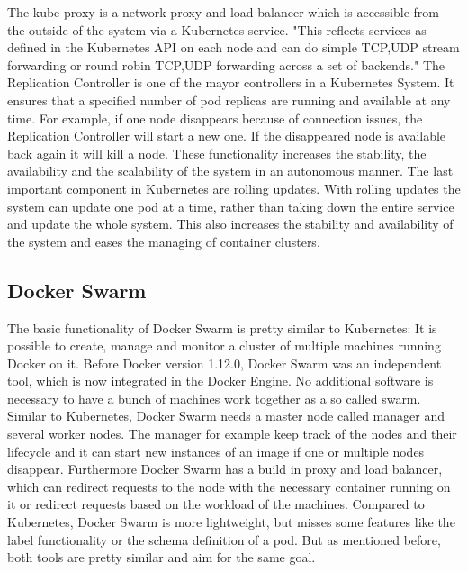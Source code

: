 The kube-proxy is a network proxy and load balancer which is accessible from the outside of the system via a Kubernetes service.\autocite[cf.][p. 7]{Mulyana:2016}
"This reflects services as defined in the Kubernetes API on each node and can do simple TCP,UDP stream forwarding or round robin TCP,UDP forwarding across a set of backends."\autocite{Kubernetes:kube-proxy:2016}
The Replication Controller is one of the mayor controllers in a Kubernetes System.
It ensures that a specified number of pod replicas are running and available at any time.\autocite[cf.]{Kubernetes:replication-controller:2016}
For example, if one node disappears because of connection issues, the Replication Controller will start a new one.
If the disappeared node is available back again it will kill a node.
These functionality increases the stability, the availability and the scalability of the system in an autonomous manner.
The last important component in Kubernetes are rolling updates.
With rolling updates the system can update one pod at a time, rather than taking down the entire service and update the whole system.\autocite[cf.]{Kubernetes:rolling-updates:2016}
This also increases the stability and availability of the system and eases the managing of container clusters.

\subsection{Docker Swarm}
The basic functionality of Docker Swarm is pretty similar to Kubernetes: It is possible to create, manage and monitor a cluster of multiple machines running Docker on it.
Before Docker version 1.12.0, Docker Swarm was an independent tool, which is now integrated in the Docker Engine.\autocite[cf.]{dockerSwarm}
No additional software is necessary to have a bunch of machines work together as a so called swarm.
Similar to Kubernetes, Docker Swarm needs a master node called manager and several worker nodes.
The manager for example keep track of the nodes and their lifecycle and it can start new instances of an image if one or multiple nodes disappear.
Furthermore Docker Swarm has a build in proxy and load balancer, which can redirect requests to the node with the necessary container running on it or redirect requests based on the workload of the machines.
Compared to Kubernetes, Docker Swarm is more lightweight, but misses some features like the label functionality or the schema definition of a pod.
But as mentioned before, both tools are pretty similar and aim for the same goal.


